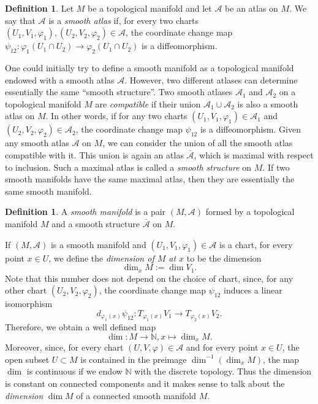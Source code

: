 \documentclass[11pt,a4paper]{book}
\theoremstyle{remark} \newtheorem{rmk}[thm]{Remark}
\theoremstyle{definition} \newtheorem{defn}[thm]{Definition}
\theoremstyle{definition} \newtheorem{ex}[thm]{Example}
\theoremstyle{definition} \newtheorem{ej}[thm]{Exercise}
\begin{document}
\begin{defn}
Let $M$ be a topological manifold and let $\mathcal{A}$ be an atlas on $M$. We say that $\mathcal{A}$ is a \emph{smooth atlas} if, for every two charts $(U_1,V_1,\varphi_1), (U_2,V_2,\varphi_2)\in \mathcal{A}$, the coordinate change map $\psi_{12}: \varphi_1(U_1\cap U_2) \rightarrow \varphi_2(U_1\cap U_2)$ is a diffeomorphism.
\end{defn}

One could initially try to define a smooth manifold as a topological manifold endowed with a smooth atlas $\mathcal{A}$. However, two different atlases can determine essentially the same ``smooth structure''. Two smooth atlases $\mathcal{A}_1$ and $\mathcal{A}_2$ on a topological manifold $M$ are \emph{compatible} if their union $\mathcal{A}_1 \cup \mathcal{A}_2$ is also a smooth atlas on $M$. In other words, if for any two charts $(U_1,V_1,\varphi_1) \in \mathcal{A}_1$ and $(U_2,V_2,\varphi_2) \in \mathcal{A}_2$, the coordinate change map $\psi_{12}$ is a diffeomorphism. Given any smooth atlas $\mathcal{A}$ on $M$, we can consider the union of all the smooth atlas compatible with it. This union is again an atlas $\bar{\mathcal{A}}$, which is maximal with respect to inclusion. Such a maximal atlas is called a \emph{smooth structure} on $M$. If two smooth manifolds have the same maximal atlas, then they are essentially the same smooth manifold.

\begin{defn}
A \emph{smooth manifold} is a pair $(M,\mathcal{A})$ formed by a topological manifold $M$ and a smooth structure $\bar{\mathcal{A}}$ on $M$.
\end{defn}

If $(M,\mathcal{A})$ is a smooth manifold and $(U_1,V_1,\varphi_1)\in \mathcal{A}$ is a chart, for every point $x\in U$, we define the \emph{dimension of $M$ at $x$} to be the dimension
\begin{equation*}
\dim_x M:= \dim V_1.
\end{equation*}
Note that this number does not depend on the choice of chart, since, for any other chart $(U_2,V_2,\varphi_2)$, the coordinate change map $\psi_{12}$ induces a linear isomorphism \[d_{\varphi_1(x)}\psi_{12}:T_{\varphi_1(x)}V_1 \rightarrow T_{\varphi_2(x)}V_2.\] Therefore, we obtain a well defined map
\begin{equation*}
\dim: M \rightarrow \mathbb{N}, x \mapsto \dim_x M.
\end{equation*}
Moreover, since, for every chart $(U,V,\varphi)\in \mathcal{A}$ and for every point $x\in U$, the open subset $U\subset M$ is contained in the preimage $\dim^{-1}(\dim_x M)$, the map $\dim$ is continuous if we endow $\mathbb{N}$ with the discrete topology. Thus the dimension is constant on connected components and it makes sense to talk about the \emph{dimension} $\dim M$ of a connected smooth manifold $M$.
\end{document}
